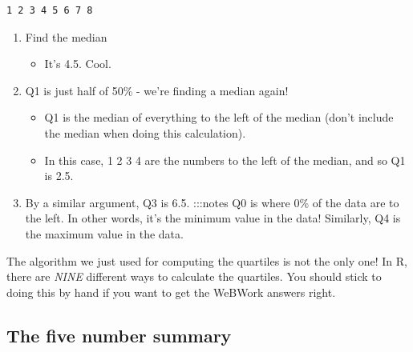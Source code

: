 \documentclass[
  letterpaper,
  DIV=11,
  numbers=noendperiod,
  oneside]{scrreprt}
\providecommand{\tightlist}{%
  \setlength{\itemsep}{0pt}\setlength{\parskip}{0pt}}\usepackage{longtable,booktabs,array}
\begin{document}
\begin{verbatim}
1 2 3 4 5 6 7 8
\end{verbatim}

\begin{enumerate}
\def\labelenumi{\arabic{enumi}.}
\tightlist
\item
  Find the median

  \begin{itemize}
  \tightlist
  \item
    It's 4.5. Cool.
  \end{itemize}
\item
  Q1 is just half of 50\% - we're finding a median again!

  \begin{itemize}
  \tightlist
  \item
    Q1 is the median of everything to the left of the median (don't
    include the median when doing this calculation).
  \item
    In this case, 1 2 3 4 are the numbers to the left of the median, and
    so Q1 is 2.5.
  \end{itemize}
\item
  By a similar argument, Q3 is 6.5. :::notes Q0 is where 0\% of the data
  are to the left. In other words, it's the minimum value in the data!
  Similarly, Q4 is the maximum value in the data.
\end{enumerate}

\begin{tcolorbox}[enhanced jigsaw, toprule=.15mm, colbacktitle=quarto-callout-warning-color!10!white, title=\textcolor{quarto-callout-warning-color}{\faExclamationTriangle}\hspace{0.5em}{Warning}, arc=.35mm, colframe=quarto-callout-warning-color-frame, colback=white, titlerule=0mm, left=2mm, bottomtitle=1mm, bottomrule=.15mm, breakable, opacitybacktitle=0.6, leftrule=.75mm, toptitle=1mm, coltitle=black, rightrule=.15mm, opacityback=0]

The algorithm we just used for computing the quartiles is not the only
one! In R, there are \emph{NINE} different ways to calculate the
quartiles. You should stick to doing this by hand if you want to get the
WeBWork answers right.

\end{tcolorbox}

\hypertarget{the-five-number-summary}{%
\subsection{The five number summary}\label{the-five-number-summary}}
\end{document}
